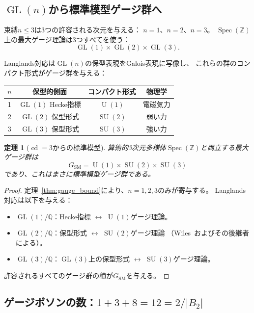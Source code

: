 \documentclass[12pt,a4paper]{article}
\newtheorem{theorem}{定理}[section]
\theoremstyle{definition}
\newcommand{\Spec}{\operatorname{Spec}}
\newcommand{\GL}{\operatorname{GL}}
\newcommand{\SU}{\operatorname{SU}}
\newcommand{\cd}{\operatorname{cd}}
\newcommand{\Q}{\mathbb{Q}}
\newcommand{\Z}{\mathbb{Z}}
\newcommand{\U}{\operatorname{U}}
\begin{document}
\subsection{$\GL(n)$から標準模型ゲージ群へ}

束縛$n \le 3$は3つの許容される次元を与える：
$n=1$、$n=2$、$n=3$。
$\Spec(\Z)$上の最大ゲージ理論は3つすべてを使う：
\begin{equation}\label{eq:GL_product}
  \GL(1) \times \GL(2) \times \GL(3).
\end{equation}

Langlands対応は$\GL(n)$の保型表現をGalois表現に写像し、
これらの群のコンパクト形式がゲージ群を与える：

\begin{center}
\begin{tabular}{cccc}
\toprule
$n$ & 保型的側面 & コンパクト形式 & 物理学 \\
\midrule
1 & $\GL(1)$ Hecke指標 & $\U(1)$ & 電磁気力 \\
2 & $\GL(2)$ 保型形式 & $\SU(2)$ & 弱い力 \\
3 & $\GL(3)$ 保型形式 & $\SU(3)$ & 強い力 \\
\bottomrule
\end{tabular}
\end{center}

\begin{theorem}[$\cd = 3$からの標準模型]\label{thm:SM}
算術的3次元多様体$\Spec(\Z)$と両立する最大ゲージ群は
\[
  G_{\mathrm{SM}} = \U(1) \times \SU(2) \times \SU(3)
\]
であり、これはまさに標準模型ゲージ群である。
\end{theorem}

\begin{proof}
定理~\ref{thm:gauge_bound}により、$n=1,2,3$のみが寄与する。
Langlands対応は以下を与える：
\begin{itemize}
  \item $\GL(1)/\Q$：Hecke指標 $\leftrightarrow$ $\U(1)$ゲージ理論。
  \item $\GL(2)/\Q$：保型形式 $\leftrightarrow$ $\SU(2)$ゲージ理論
    （Wiles~\cite{Wiles}およびその後継者による）。
  \item $\GL(3)/\Q$：$\GL(3)$上の保型形式
    $\leftrightarrow$ $\SU(3)$ゲージ理論。
\end{itemize}
許容されるすべてのゲージ群の積が$G_{\mathrm{SM}}$を与える。
\end{proof}

\subsection{ゲージボソンの数：$1+3+8 = 12 = 2/|B_2|$}
\end{document}

